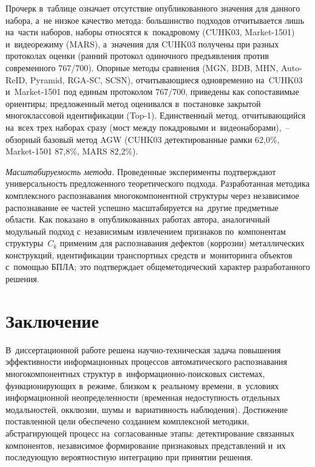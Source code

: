 Прочерк в~таблице означает отсутствие опубликованного значения для
данного набора, а~не низкое качество метода: большинство подходов
отчитывается лишь на~части наборов, наборы относятся к~покадровому
(CUHK03, Market-1501) и~видеорежиму (MARS), а~значения для CUHK03
получены при разных протоколах оценки (ранний протокол одиночного предъявления против
современного 767/700). Опорные методы сравнения (MGN, BDB, MHN, Auto-ReID,
Pyramid, RGA-SC, SCSN), отчитывающиеся одновременно на~CUHK03
и~Market-1501 под единым протоколом 767/700, приведены как сопоставимые
ориентиры; предложенный метод оценивался в~постановке закрытой
многоклассовой идентификации (Top-1). Единственный метод, отчитывающийся
на~всех трех наборах сразу (мост между покадровыми и~видеонаборами),~--
обзорный базовый метод AGW (CUHK03 детектированные рамки 62,0\%, Market-1501 87,8\%,
MARS 82,2\%).

\textit{Масштабируемость метода.} Проведенные эксперименты
подтверждают универсальность предложенного теоретического подхода.
Разработанная методика комплексного распознавания многокомпонентной структуры
через независимое распознавание ее частей успешно масштабируется на~другие
предметные области. Как показано в~опубликованных работах автора,
аналогичный модульный подход с~независимым извлечением признаков
по~компонентам структуры~$C_k$ применим для распознавания дефектов
(коррозии) металлических конструкций, идентификации транспортных средств
и~мониторинга объектов с~помощью БПЛА; это подтверждает общеметодический характер разработанного
решения.

\FloatBarrier

\section*{Заключение}

В~диссертационной работе решена научно-техническая задача повышения
эффективности информационных процессов автоматического распознавания
многокомпонентных структур в~информационно-поисковых системах, функционирующих
в~режиме, близком к~реальному времени, в~условиях информационной
неопределенности (временная недоступность отдельных модальностей, окклюзии,
шумы и~вариативность наблюдения). Достижение поставленной цели обеспечено
созданием комплексной методики, абстрагирующей процесс на~согласованные
этапы: детектирование связанных компонентов, независимое формирование
признаковых представлений и~их последующую вероятностную интеграцию при
принятии решения.

